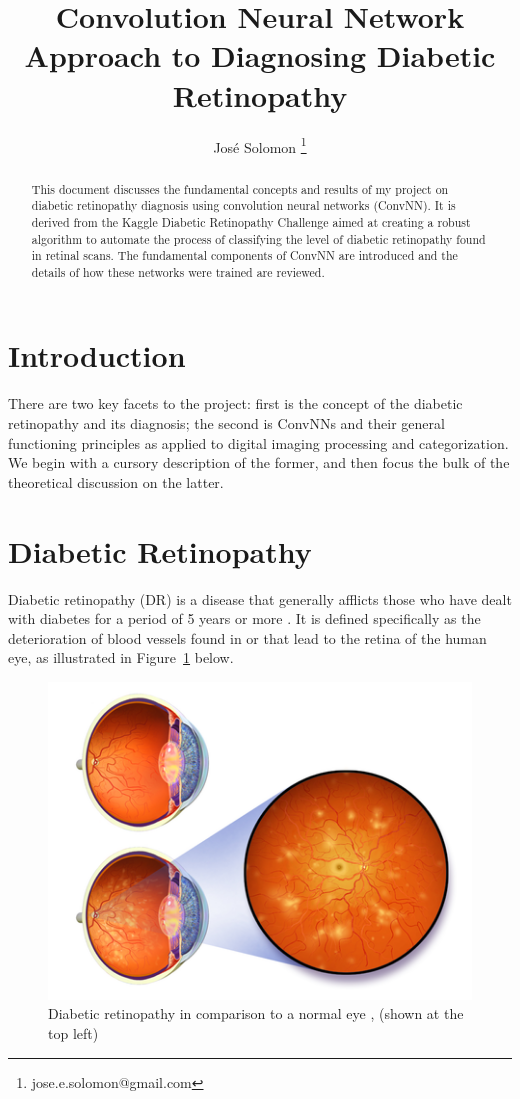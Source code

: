\documentclass[letterpaper,12pt]{article}
\title{Convolution Neural Network Approach to Diagnosing Diabetic Retinopathy}
\author{Jos\'e Solomon \thanks{jose.e.solomon@gmail.com} }
\date{}
\newcommand{\figref}[1]{Figure~\ref{#1}}
\begin{document}
\maketitle
\begin{abstract}
This document discusses the fundamental concepts and results of my project on diabetic retinopathy diagnosis using convolution neural networks (ConvNN). It is derived from the Kaggle Diabetic Retinopathy Challenge \cite{kaggle} aimed at creating a robust algorithm to automate the process of classifying the level of diabetic retinopathy found in retinal scans. The fundamental components of ConvNN are introduced and the details of how these networks were trained are reviewed.
\end{abstract}
\tableofcontents

\section{Introduction}

There are two key facets to the project: first is the concept of the diabetic retinopathy and its diagnosis; the second is ConvNNs and their general functioning principles as applied to digital imaging processing and categorization. We begin with a cursory description of the former, and then focus the bulk of the theoretical discussion on the latter.

\section{Diabetic Retinopathy}

Diabetic retinopathy (DR) is a disease that generally afflicts those who have dealt with diabetes for a period of 5 years or more \cite{nih}. It is defined specifically as the deterioration of blood vessels found in or that lead to the retina of the human eye, as illustrated in \figref{eye} below.

\begin{figure}[htbp]
\begin{center}
\includegraphics[scale=0.6]{images/illustration.png}
\caption{Diabetic retinopathy in comparison to a normal eye \cite{wiki}, (shown at the top left)}
\label{eye}
\end{center}
\end{figure}
\end{document}
